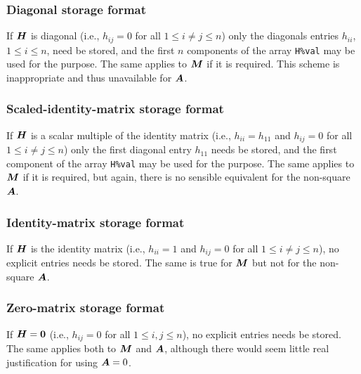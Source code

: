 \documentclass{galahad}
\begin{document}
\subsubsection{Diagonal storage format}\label{diagonal}
If ${\bm{H}}$ is diagonal (i.e., $h_{ij} = 0$ for all $1 \leq i \neq j \leq n$)
only the diagonals entries $h_{ii}$, $1 \leq i \leq n$,  need be stored,
and the first $n$ components of the array {\tt H\%val} may be used for
the purpose. The same applies to ${\bm{M}}$ if it is required.
This scheme is inappropriate and thus unavailable for ${\bm{A}}$.

\subsubsection{Scaled-identity-matrix storage format}\label{scaled-identity}
If ${\bm{H}}$ is a scalar multiple of the identity matrix
(i.e., $h_{ii} = h_{11}$  and $h_{ij} = 0$ for all $1 \leq i \neq j \leq n$)
only the first diagonal entry $h_{11}$ needs be stored,
and the first component of the array {\tt H\%val} may be used for
the purpose. The same applies to ${\bm{M}}$ if it is required, but again, 
there is no sensible equivalent for the non-square ${\bm{A}}$.

\subsubsection{Identity-matrix storage format}\label{identity}
If ${\bm{H}}$ is the identity matrix
(i.e., $h_{ii} = 1$ and $h_{ij} = 0$ for all $1 \leq i \neq j \leq n$),
no explicit entries needs be stored. The same is true for ${\bm{M}}$ but
not for the non-square ${\bm{A}}$.

\subsubsection{Zero-matrix storage format}\label{zero}
If ${\bm{H}} = {\bm{0}}$ (i.e., $h_{ij} = 0$ for all $1 \leq i, j \leq n$),
no explicit entries needs be stored. The same applies both to ${\bm{M}}$ and ${\bm{A}}$,
although there would seem little real justification for using ${\bm{A}} = 0$.







\end{document}
